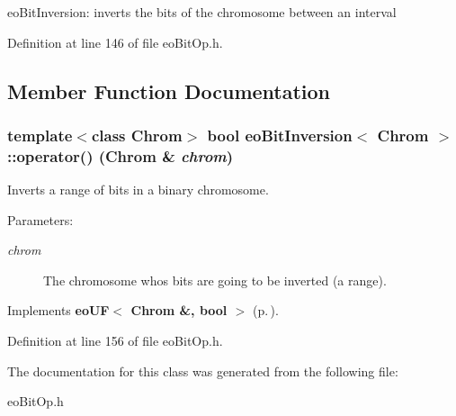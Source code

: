 eo\-Bit\-Inversion: inverts the bits of the chromosome between an interval 



Definition at line 146 of file eo\-Bit\-Op.h.

\subsection{Member Function Documentation}
\subsubsection{\setlength{\rightskip}{0pt plus 5cm}template$<$class Chrom$>$ bool {\bf eo\-Bit\-Inversion}$<$ Chrom $>$::operator() (Chrom \& {\em chrom})\hspace{0.3cm}{\tt  [inline, virtual]}}\label{classeo_bit_inversion_a1}


Inverts a range of bits in a binary chromosome. 

\begin{Desc}
\item[Parameters:]
\begin{description}
\item[{\em chrom}]The chromosome whos bits are going to be inverted (a range). \end{description}
\end{Desc}


Implements {\bf eo\-UF$<$ Chrom \&, bool $>$} {\rm (p.\,\pageref{classeo_u_f_a1})}.

Definition at line 156 of file eo\-Bit\-Op.h.

The documentation for this class was generated from the following file:\begin{CompactItemize}
\item 
eo\-Bit\-Op.h\end{CompactItemize}
